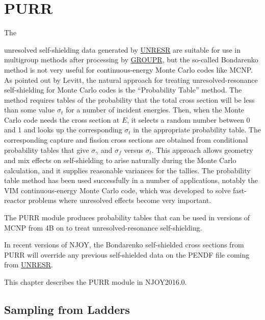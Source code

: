 \section{PURR}
\label{sPURR}

\hypertarget{sPURRhy}{The}
unresolved self-shielding data generated
by \hyperlink{sUNRESRhy}{UNRESR} are
suitable for use in multigroup methods
after processing by \hyperlink{sGROUPRhy}{GROUPR},
but the so-called
Bondarenko method\cite{Bondarenko}
is not very useful for continuous-energy Monte Carlo
codes like MCNP\cite{MCNP}.  As pointed out by
Levitt\cite{levitt}, the natural approach for treating
unresolved-resonance self-shielding for
Monte Carlo codes is the ``Probability Table'' method.
  The method requires tables of
the probability that the total cross section will be less than some
value $\sigma_t$ for a number of incident energies.  Then, when the
Monte Carlo code needs the cross section at $E$, it selects a
random number between 0 and 1 and looks up the corresponding $\sigma_t$
in the appropriate probability table.  The corresponding capture and
fission cross sections are obtained from conditional probability
tables that give $\sigma_\gamma$ and $\sigma_f$ versus $\sigma_t$.
This approach allows geometry and mix effects on self-shielding to
arise naturally during the Monte Carlo calculation, and it supplies
reasonable variances for the tallies.  The probability table method
has been used successfully in a number of applications, notably the VIM
continuous-energy Monte Carlo code\cite{vim}, which was
developed to solve fast-reactor problems where unresolved effects
become very important.

The PURR module produces probability tables that can be used in
versions of MCNP from 4B on to treat unresolved-resonance
self-shielding.

In recent versions of NJOY, the Bondarenko self-shielded cross sections
from PURR will override any previous self-shielded data on the
PENDF file coming from \hyperlink{sUNRESRhy}{UNRESR}.

This chapter describes the PURR module in NJOY2016.0.

\subsection{Sampling from Ladders}
\label{ssPURR_ladder}

